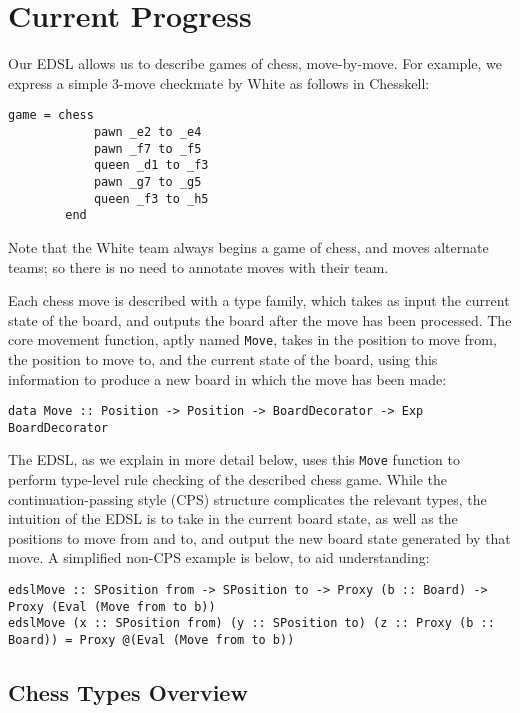 \documentclass[12pt, a4paper, bibliography=totocnumbered]{scrartcl}
\begin{document}
\section{Current Progress} \label{examplegame}

Our EDSL allows us to describe games of chess, move-by-move. For example, we express a simple 3-move checkmate by White as follows in Chesskell:

\begin{lstlisting}
game = chess
            pawn _e2 to _e4
            pawn _f7 to _f5
            queen _d1 to _f3
            pawn _g7 to _g5
            queen _f3 to _h5
        end
\end{lstlisting}

Note that the White team always begins a game of chess, and moves alternate teams; so there is no need to annotate moves with their team.

Each chess move is described with a type family, which takes as input the current state of the board, and outputs the board after the move has been processed. The core movement function, aptly named \lstinline{Move}, takes in the position to move from, the position to move to, and the current state of the board, using this information to produce a new board in which the move has been made:

\begin{lstlisting}
data Move :: Position -> Position -> BoardDecorator -> Exp BoardDecorator
\end{lstlisting}

The EDSL, as we explain in more detail below, uses this \lstinline{Move} function to perform type-level rule checking of the described chess game. While the continuation-passing style (CPS) structure complicates the relevant types, the intuition of the EDSL is to take in the current board state, as well as the positions to move from and to, and output the new board state generated by that move. A simplified non-CPS example is below, to aid understanding:

\begin{lstlisting}
edslMove :: SPosition from -> SPosition to -> Proxy (b :: Board) -> Proxy (Eval (Move from to b))
edslMove (x :: SPosition from) (y :: SPosition to) (z :: Proxy (b :: Board)) = Proxy @(Eval (Move from to b))
\end{lstlisting}

\subsection{Chess Types Overview}
\end{document}
